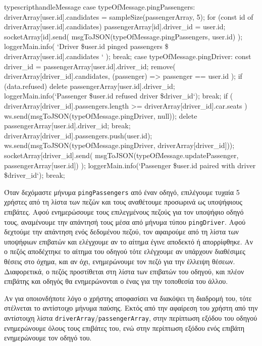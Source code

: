 \documentclass[../thesis.tex]{subfiles}
\begin{document}
\begin{codeblock}{typescript}{handleMessage}
  case typeOfMessage.pingPassengers: {
    driverArray[user.id].candidates = sampleSize(passengerArray, 5);
    for (const id of driverArray[user.id].candidates) {
      passengerArray[id].driver_id = user.id;
      socketArray[id].send(
        msgToJSON(typeOfMessage.pingPassengers, user.id)
      );
    }
    loggerMain.info(
      `Driver \${user.id} pinged passengers \${
        driverArray[user.id].candidates
      }`
    );
    break;
  }
  case typeOfMessage.pingDriver: {
    const driver_id = passengerArray[user.id].driver_id;
    remove(
      driverArray[driver_id].candidates,
      (passenger) => passenger == user.id
    );
    if (data.refused) {
      delete passengerArray[user.id].driver_id;
      loggerMain.info(`Passenger \${user.id} refused driver \${driver_id}`);
      break;
    }
    if (
      driverArray[driver_id].passengers.length >=
      driverArray[driver_id].car.seats
    ) {
      ws.send(msgToJSON(typeOfMessage.pingDriver, null));
      delete passengerArray[user.id].driver_id;
      break;
    }
    driverArray[driver_id].passengers.push(user.id);
    ws.send(msgToJSON(typeOfMessage.pingDriver, driverArray[driver_id]));
    socketArray[driver_id].send(
      msgToJSON(typeOfMessage.updatePassenger, passengerArray[user.id])
    );
    loggerMain.info(`Passenger \${user.id} paired with driver \${driver_id}`);
    break;
  }
\end{codeblock}

Όταν δεχόμαστε μήνυμα \verb|pingPassengers| από έναν οδηγό, επιλέγουμε τυχαία 5 χρήστες από τη λίστα των πεζών και τους αναθέτουμε προσωρινά ως υποψήφιους επιβάτες.
Αφού ενημερώσουμε τους επιλεγμένους πεζούς για τον υποψήφιο οδηγό τους, αναμένουμε την απάντησή τους μέσα από μήνυμα τύπου \verb|pingDriver|.
Αφού δεχτούμε την απάντηση ενός δεδομένου πεζού, τον αφαιρούμε από τη λίστα των υποψήφιων επιβατών και ελέγχουμε αν το αίτημα έγινε αποδεκτό ή απορρίφθηκε.
Αν ο πεζός αποδέχτηκε το αίτημα του οδηγού τότε ελέγχουμε αν υπάρχουν διαθέσιμες θέσεις στο όχημα, και αν όχι, ενημερώνουμε τον πεζό για την έλλειψη θέσεων.
Διαφορετικά, ο πεζός προστίθεται στη λίστα των επιβατών του οδηγού, και πλέον επιβάτης και οδηγός θα ενημερώνονται ο ένας για την τοποθεσία του άλλου.

Αν για οποιονδήποτε λόγο ο χρήστης αποφασίσει να διακόψει τη διαδρομή του, τότε στέλνεται το αντίστοιχο μήνυμα παύσης.
Εκτός από την αφαίρεση του χρήστη από την αντίστοιχη λίστα \verb|driverArray|/\verb|passengerArray|, στην περίπτωση εξόδου του οδηγού ενημερώνουμε όλους τους επιβάτες του, ενώ στην περίπτωση εξόδου ενός επιβάτη ενημερώνουμε τον οδηγό του.
\end{document}
